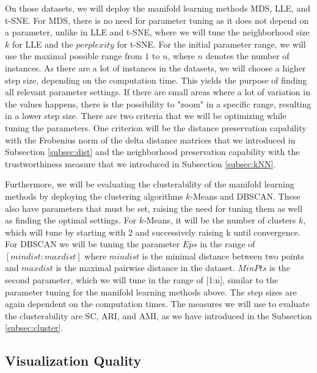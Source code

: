 On those datasets, we will deploy the manifold learning methods MDS, LLE, and t-SNE. For MDS, there is no need for parameter tuning as it does not depend on a parameter, unlike in LLE and t-SNE, where we will tune the neighborhood size $k$ for LLE and the $perplexity$ for t-SNE. For the initial parameter range, we will use the maximal possible range from $1$ to $n$, where $n$ denotes the number of instances. As there are a lot of instances in the datasets, we will choose a higher step size, depending on the computation time. This yields the purpose of finding all relevant parameter settings. If there are small areas where a lot of variation in the values happens, there is the possibility to "zoom" in a specific range, resulting in a lower step size. There are two criteria that we will be optimizing while tuning the parameters. One criterion will be the distance preservation capability with the Frobenius norm of the delta distance matrices that we introduced in Subsection \ref{subsec:dist} and the neighborhood preservation capability with the trustworthiness measure that we introduced in Subsection \ref{subsec:kNN}.

Furthermore, we will be evaluating the clusterability of the manifold learning methods by deploying the clustering algorithms $k$-Means and DBSCAN. These also have parameters that must be set, raising the need for tuning them as well as finding the optimal settings. For $k$-Means, it will be the number of clusters $k$, which will tune by starting with $2$ and successively raising k until convergence. For DBSCAN we will be tuning the parameter $Eps$ in the range of $[mindist:maxdist]$ where $mindist$ is the minimal distance between two points and $maxdist$ is the maximal pairwise distance in the dataset. $MinPts$ is the second parameter, which we will tune in the range of [1:n], similar to the parameter tuning for the manifold learning methods above. The step sizes are again dependent on the computation times. The measures we will use to evaluate the clusterability are SC, ARI, and AMI, as we have introduced in the Subsection \ref{subsec:cluster}.

\subsection{Visualization Quality} \label{subsec:vis_qual}

